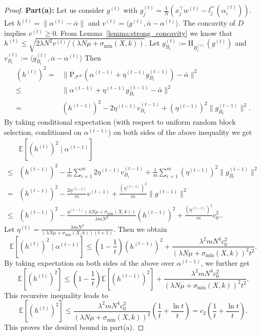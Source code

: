 \documentclass[11pt]{article}
\numberwithin{equation}{section}
\numberwithin{table}{section}
\numberwithin{figure}{section}
\begin{document}
\begin{proof}
\noindent\textbf{Part(a):} Let us consider $g^{(t)}$ with $g_j^{(t)}=\frac{1}{N}(x_j^\top w^{(t)}- l^{*'}_j(\alpha_i^{(t)}))$. Let $h^{(t)} = \|\alpha^{(t)} - \bar \alpha\|$ and $v^{(t)} = \langle g^{(t)}, \bar\alpha -\alpha^{(t)}\rangle$. The concavity of $D$ implies $v^{(t)}\ge 0$. From Lemma~\ref{lemma:strong_concavity} we know that $h^{(t)}\le \sqrt{2\lambda N^2 v^{(t)}/(\lambda N \mu + \sigma_{\min}(X,k))}$. Let $g^{(t)}_{B_i}:=\mathrm{H}_{B_i^{(t)}}(g^{(t)})$ and $v_{B_i}^{(t)}:=\langle g^{(t)}_{B_i}, \bar\alpha -\alpha^{(t)}\rangle$ Then
\[
\begin{aligned}
(h^{(t)})^2 =& \|\mathrm{P}_{\mathcal{F^N}}\left(\alpha^{(t-1)}+\eta^{(t-1)} g_{B_i}^{(t-1)}\right) - \bar \alpha\|^2 \\
\le& \|\alpha^{(t-1)} + \eta^{(t-1)} g_{B_i}^{(t-1)} - \bar \alpha\|^2 \\
=& (h^{(t-1)})^2 - 2\eta^{(t-1)} v_{B_i}^{(t-1)} + (\eta^{(t-1)})^2 \|g_{B_i}^{(t-1)}\|^2.
\end{aligned}
\]
By taking conditional expectation (with respect to uniform random block selection, conditioned on $\alpha^{(t-1)}$) on both sides of the above inequality we get
\[
\begin{aligned}
&\mathbb{E}[(h^{(t)})^2\mid \alpha^{(t-1)}] \\
\le& (h^{(t-1)})^2 - \frac{1}{m}\sum_{i=1}^m 2\eta^{(t-1)} v_{B_i}^{(t-1)} + \frac{1}{m}\sum_{i=1}^m(\eta^{(t-1)})^2 \|g_{B_i}^{(t-1)}\|^2 \\
=& (h^{(t-1)})^2 - \frac{2\eta^{(t-1)}}{m} v^{(t-1)} + \frac{(\eta^{(t-1)})^2}{m} \|g^{(t-1)}\|^2 \\
\le& (h^{(t-1)})^2 - \frac{\eta^{(t-1)}(\lambda N \mu + \sigma_{\min}(X,k))}{\lambda m N^2} (h^{(t-1)})^2 + \frac{(\eta^{(t-1)})^2}{m} c_0^2..
\end{aligned}
\]
Let $\eta^{(t)} = \frac{\lambda m N^2}{(\lambda N \mu + \sigma_{\min}(X,k))(t+1)}$. Then we obtain
\[
\mathbb{E}[(h^{(t)})^2\mid \alpha^{(t-1)}] \le \left(1-\frac{1}{t}\right) (h^{(t-1)})^2 + \frac{\lambda^2 m N^4 c_0^2}{(\lambda N \mu + \sigma_{\min}(X,k))^2t^2}.
\]
By taking expectation on both sides of the above over $\alpha^{(t-1)}$, we further get
\[
\mathbb{E}[(h^{(t)})^2] \le \left(1-\frac{1}{t}\right) \mathbb{E}[(h^{(t-1)})^2] + \frac{\lambda^2 m N^4 c_0^2}{(\lambda N \mu + \sigma_{\min}(X,k))^2t^2}.
\]
This recursive inequality leads to
\[
\mathbb{E}[(h^{(t)})^2] \le \frac{\lambda^2 m N^4 c_0^2}{(\lambda N \mu + \sigma_{\min}(X,k))^2} \left(\frac{1}{t} + \frac{\ln t}{t}\right) = c_2 \left(\frac{1}{t} + \frac{\ln t}{t}\right).
\]
This proves the desired bound in part(a).


\end{proof}
\end{document}
